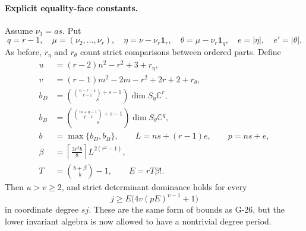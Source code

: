 \paragraph{Explicit equality-face constants.}
Assume $\nu_1=as$. Put
\[
 q=r-1,\quad \mu=(\nu_2,\ldots,\nu_r),\quad
 \eta=\nu-\nu_r\mathbf1_r,\quad
 \theta=\mu-\nu_r\mathbf1_q,
 \quad e=|\eta|,\quad e'=|\theta|.
\]
As before, $r_\eta$ and $r_\theta$ count strict comparisons
between ordered parts. Define
\[
 \begin{aligned}
 u&=(r-2)n^2-r^2+3+r_\eta,\\
 v&=(r-1)m^2-2m-r^2+2r+2+r_\theta,\\
 b_D&=\binom{\binom{n+r-1}{r-1}+s-1}{s}
                    \dim S_\eta\mathbb C^r,\\
 b_B&=\binom{\binom{m+q-1}{q-1}+s-1}{s}
                    \dim S_\theta\mathbb C^q,\\
 b&=\max\{b_D,b_B\},\qquad
 L=ns+(r-1)e,\qquad p=ns+e,\\
 \beta&=\left\lceil\frac{3r^2b}{8}\right\rceil
                      L^{2(r^2-1)},\\
 T&=\binom{b+\beta}{b}-1,\qquad E=rT\beta!.
 \end{aligned}
\]
Then $u>v\ge2$, and strict determinant dominance holds for
every
\begin{equation}\label{G27:threshold}
                    j\ge E\bigl(4v(pE)^{v-1}+1\bigr)
\end{equation}
in coordinate degree $sj$. These are the same form of bounds
as G-26, but the lower invariant algebra is now allowed to
have a nontrivial degree period.

